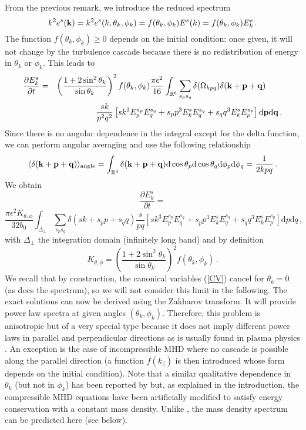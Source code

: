 \documentclass{jpp}
\def\be{\begin{equation}}
\def\ee{\end{equation}}
\def\ba{\begin{eqnarray}}
\def\ea{\end{eqnarray}}
\def\kk{{\bf k}}
\def\pp{{\bf p}}
\def\qq{{\bf q}}
\def\kpa{k_{\parallel}}
\def\dd{\mathrm{d}}
\def\RR{{\mathbb{R}}}
\begin{document}
From the previous remark, we introduce the reduced spectrum 
\be
k^2 e^s(\kk)= k^2 e^s(k,\theta_k,\phi_k) = f(\theta_k,\phi_k) E^s(k) = f(\theta_k,\phi_k) E^s_k \, .
\ee 
The function $f(\theta_k,\phi_k) \ge 0$ depends on the initial condition: once given, it will not change by the turbulence cascade because there is no redistribution of energy in $\theta_k$ or $\phi_k$. This leads to
\ba
\frac{\partial E^s_k}{\partial t} &=& \left(\frac{1 + 2 \sin^2 \theta_k}{\sin \theta_k}\right)^2 f(\theta_k,\phi_k)
\frac{\pi \epsilon^{2}}{16} \int_{\RR^{6}} \sum_{s_{p} s_{q}}  
\delta(\Omega_{kpq}) \delta(\kk+\pp+\qq) \quad \quad \label{Kx2} \\
&& \frac{s k}{p^2q^2} 
\left[ sk^3 E^{s_p}_p E^{s_q}_q + s_p p^3 E^s_k E^{s_q}_q + s_q q^3 E^s_k E^{s_p}_p \right] 
 \dd \pp \dd \qq \, . \nonumber 
\ea
Since there is no angular dependence in the integral except for the delta function, we can perform angular averaging and use the following relationship \citep{ZLF92}
\be
\langle \delta(\kk+\pp+\qq) \rangle_{\rm angle} = 
\int_{\RR^{4}} \delta(\kk+\pp+\qq) \dd \cos \theta_p \dd \cos \theta_q \dd \phi_p \dd \phi_q = \frac{1}{2kpq} \, .
\ee
We obtain
\be \label{510}
\frac{\partial E^s_k}{\partial t} = 
\ee
$$
\frac{\pi \epsilon^{2} K_{\theta,\phi}}{32b_0} \int_{\Delta_\perp} \sum_{s_{p} s_{q}}  
\delta(sk+s_pp+s_qq)\frac{s}{pq} 
\left[ sk^3 E^{s_p}_p E^{s_q}_q + s_p p^3 E^s_k E^{s_q}_q + s_q q^3 E^s_k E^{s_p}_p \right]  \dd p \dd q \, ,  
$$
with $\Delta_\perp$ the integration domain (infinitely long band) and by definition 
\be
K_{\theta,\phi} = \left(\frac{1 + 2 \sin^2 \theta_k}{\sin \theta_k}\right)^2 f(\theta_k,\phi_k) \, .
\ee
We recall that by construction, the canonical variables (\ref{CV}) cancel for $\theta_k=0$ (as does the spectrum), so we will not consider this limit in the following. The exact solutions can now be derived using the Zakharov transform. It will provide power law spectra at given angles $(\theta_k, \phi_k)$. Therefore, this problem is anisotropic but of a very special type because it does not imply different power laws in parallel and perpendicular directions as is usually found in plasma physics \citep{Galtier2003b,Galtier2006,Galtier2014,Galtier2015}. An exception is the case of incompressible MHD \citep{Galtier2000} where no cascade is possible along the parallel direction (a function $f(\kpa)$ is then introduced whose form depends on the initial condition). Note that a similar qualitative dependence in $\theta_k$ (but not in $\phi_k$) has been reported by \cite{Chandran2005} but, as explained in the introduction, the compressible MHD equations have been artificially modified to satisfy energy conservation with a constant mass density. Unlike \cite{Chandran2005}, the mass density spectrum can be predicted here (see below). 
\end{document}
